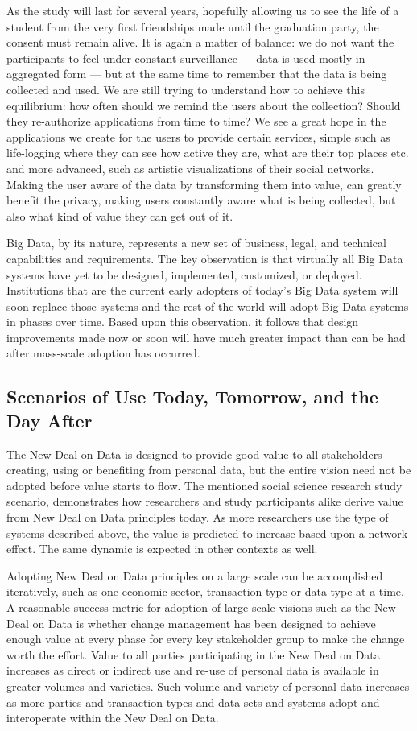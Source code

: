 As the study will last for several years, hopefully allowing us to see the life of a student from the very first friendships made until the graduation party, the consent must remain alive.
It is again a matter of balance: we do not want the participants to feel under constant surveillance --- data is used mostly in aggregated form --- but at the same time to remember that the data is being collected and used.
We are still trying to understand how to achieve this equilibrium: how often should we remind the users about the collection? Should they re-authorize applications from time to time?
We see a great hope in the applications we create for the users to provide certain services, simple such as life-logging where they can see how active they are, what are their top places etc. and more advanced, such as artistic visualizations of their social networks.
Making the user aware of the data by transforming them into value, can greatly benefit the privacy, making users constantly aware what is being collected, but also what kind of value they can get out of it.

Big Data, by its nature, represents a new set of business, legal, and technical capabilities and requirements.
The key observation is that virtually all Big Data systems have yet to be designed, implemented, customized, or deployed.
Institutions that are the current early adopters of today’s Big Data system will soon replace those systems and the rest of the world will adopt Big Data systems in phases over time.
Based upon this observation, it follows that design improvements made now or soon will have much greater impact than can be had after mass-scale adoption has occurred.  

 \subsection{Scenarios of Use Today, Tomorrow, and the Day After}

The New Deal on Data is designed to provide good value to all stakeholders creating, using or benefiting from personal data, but the entire vision need not be adopted before value starts to flow.
The mentioned social science research study scenario, demonstrates how researchers and study participants alike derive value from New Deal on Data principles today.
As more researchers use the type of systems described above, the value is predicted to increase based upon a network effect.
The same dynamic is expected in other contexts as well. 

Adopting New Deal on Data principles on a large scale can be accomplished iteratively, such as one economic sector, transaction type or data type at a time.
A reasonable success metric for adoption of large scale visions such as the New Deal on Data is whether change management has been designed to achieve enough value at every phase for every key stakeholder group to make the change worth the effort.
Value to all parties participating in the New Deal on Data increases as direct or indirect use and re-use of personal data is available in greater volumes and varieties.
Such volume and variety of personal data increases as more parties and transaction types and data sets and systems adopt and interoperate within the New Deal on Data.    

